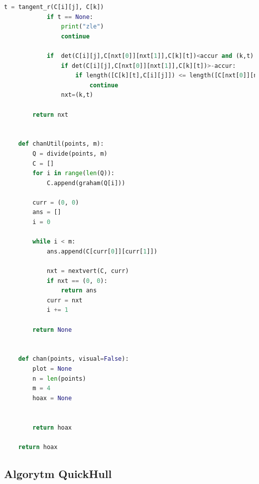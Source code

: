 \documentclass[11pt]{article}
\theoremstyle{remark} \newtheorem{definition}{def.}
\theoremstyle{definition} \newtheorem{twierdzenie}{tw.}
\begin{document}
\begin{lstlisting}[language=Python]
            t = tangent_r(C[i][j], C[k])
            if t == None:
                print("zle")
                continue
    
            if  det(C[i][j],C[nxt[0]][nxt[1]],C[k][t])<accur and (k,t)!=(curr):
                if det(C[i][j],C[nxt[0]][nxt[1]],C[k][t])>-accur:
                    if length([C[k][t],C[i][j]]) <= length([C[nxt[0]][nxt[1]],C[i][j]]):
                        continue
                nxt=(k,t)
    
        return nxt
    
    
    def chanUtil(points, m):
        Q = divide(points, m)
        C = []
        for i in range(len(Q)):
            C.append(graham(Q[i]))
    
        curr = (0, 0)
        ans = []
        i = 0
    
        while i < m:
            ans.append(C[curr[0]][curr[1]])
    
            nxt = nextvert(C, curr)
            if nxt == (0, 0):
                return ans
            curr = nxt
            i += 1
    
        return None
    
    
    def chan(points, visual=False):
        plot = None
        n = len(points)
        m = 4
        hoax = None
    
    
        return hoax
    
    return hoax
\end{lstlisting}
    

\subsection{Algorytm QuickHull}
\end{document}
